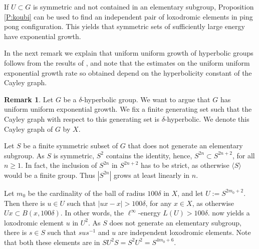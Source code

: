 \documentclass[leqno,a4paper,10pt]{amsart}
\theoremstyle{plain}
\theoremstyle{definition}
\newtheorem{rem}[thm]{Remark}
\theoremstyle{remark}
\begin{document}
If $U\subset G$ is symmetric and not contained in an elementary subgroup, Proposition \ref{P:koubi} can be used to find an independent pair of loxodromic elements in ping pong configuration. This yields that symmetric sets of sufficiently large energy have exponential growth.

In the next remark we explain that uniform uniform growth of hyperbolic groups follows from the results of \cite{koubi_croissance_1998}, and note that the estimates on the uniform uniform exponential growth rate so obtained depend on the hyperbolicity constant of the Cayley graph. 

\begin{rem}\label{R:proof_koubi} Let $G$ be a $\delta$-hyperbolic group. We want to argue that $G$ has uniform uniform exponential growth.  We fix a finite generating set such that the Cayley graph with respect to this generating set is $\delta$-hyperbolic. We denote this Cayley graph of $G$ by $X$. 

Let $S$ be a finite symmetric subset of $G$ that does not generate an elementary subgroup. As $S$ is symmetric, $S^2$ contains the identity, hence, $S^{2n}\subset S^{2n+2}$, for all $n\geqslant 1$. In fact, the inclusion of $S^{2n}$ in $S^{2n+2}$ has to be strict, as otherwise $\langle S\rangle$ would be a finite group. Thus $|S^{2n}|$ grows at least linearly in $n$. 


Let $m_0$ be the cardinality of the ball of radius $100\delta$ in $X$, and let $U:=S^{2m_0+2}$. Then there is $u\in U$ such that $|ux-x|>100\delta$, for any $x\in X$, as otherwise $Ux\subset B(x,100\delta)$. In other words, the $\ell^{\infty}$-energy $L(U)>100\delta$. \cite[Proposition 3.2]{koubi_croissance_1998} now yields a loxodromic element $u$ in $U^2$. As $S$ does not generate an elementary subgroup, there is $s\in S$ such that $sus^{-1}$ and $u$ are independent loxodromic elements. Note that both these elements are in $SU^2S=S^2U^2=S^{4m_0+6}$.


\end{rem}
\end{document}
